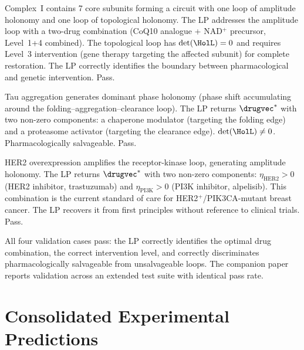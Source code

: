 \begin{example}
\label{ex:mito-validation}
Complex~I contains 7 core subunits forming a circuit with one loop of
amplitude holonomy and one loop of topological holonomy.  The LP addresses
the amplitude loop with a two-drug combination (CoQ10 analogue + NAD$^+$
precursor, Level~1+4 combined).  The topological loop has $\det(\HolL) = 0$
and requires Level~3 intervention (gene therapy targeting the affected subunit)
for complete restoration.  The LP correctly identifies the boundary between
pharmacological and genetic intervention.  Pass.
\end{example}

\begin{example}
\label{ex:tau-validation}
Tau aggregation generates dominant phase holonomy (phase shift accumulating
around the folding--aggregation--clearance loop).  The LP returns
$\drugvec^*$ with two non-zero components: a chaperone modulator (targeting
the folding edge) and a proteasome activator (targeting the clearance edge).
$\det(\HolL) \neq 0$.  Pharmacologically salvageable.  Pass.
\end{example}

\begin{example}
\label{ex:her2-validation}
HER2 overexpression amplifies the receptor-kinase loop, generating amplitude
holonomy.  The LP returns $\drugvec^*$ with two non-zero components:
$\eta_{\mathrm{HER2}} > 0$ (HER2 inhibitor, trastuzumab) and
$\eta_{\mathrm{PI3K}} > 0$ (PI3K inhibitor, alpelisib).  This combination is
the current standard of care for HER2$^+$/PIK3CA-mutant breast cancer.  The
LP recovers it from first principles without reference to clinical trials.
Pass.
\end{example}

\begin{remark}
All four validation cases pass: the LP correctly identifies the optimal
drug combination, the correct intervention level, and correctly discriminates
pharmacologically salvageable from unsalvageable loops.  The companion paper
reports validation across an extended test suite with identical pass rate.
\end{remark}

\section{Consolidated Experimental Predictions}
\label{sec:all-predictions}

